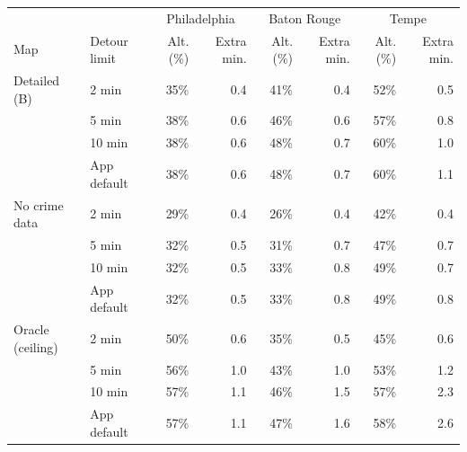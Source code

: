 \begin{tabular}{llrrrrrr}
\toprule
 & & \multicolumn{2}{c}{Philadelphia} & \multicolumn{2}{c}{Baton Rouge} & \multicolumn{2}{c}{Tempe} \\
Map & Detour limit & Alt. (\%) & Extra min. & Alt. (\%) & Extra min. & Alt. (\%) & Extra min. \\
\midrule
Detailed (B) & 2 min & 35\% & 0.4 & 41\% & 0.4 & 52\% & 0.5 \\
 & 5 min & 38\% & 0.6 & 46\% & 0.6 & 57\% & 0.8 \\
 & 10 min & 38\% & 0.6 & 48\% & 0.7 & 60\% & 1.0 \\
 & App default & 38\% & 0.6 & 48\% & 0.7 & 60\% & 1.1 \\
\midrule
No crime data & 2 min & 29\% & 0.4 & 26\% & 0.4 & 42\% & 0.4 \\
 & 5 min & 32\% & 0.5 & 31\% & 0.7 & 47\% & 0.7 \\
 & 10 min & 32\% & 0.5 & 33\% & 0.8 & 49\% & 0.7 \\
 & App default & 32\% & 0.5 & 33\% & 0.8 & 49\% & 0.8 \\
\midrule
Oracle (ceiling) & 2 min & 50\% & 0.6 & 35\% & 0.5 & 45\% & 0.6 \\
 & 5 min & 56\% & 1.0 & 43\% & 1.0 & 53\% & 1.2 \\
 & 10 min & 57\% & 1.1 & 46\% & 1.5 & 57\% & 2.3 \\
 & App default & 57\% & 1.1 & 47\% & 1.6 & 58\% & 2.6 \\
\bottomrule
\end{tabular}
